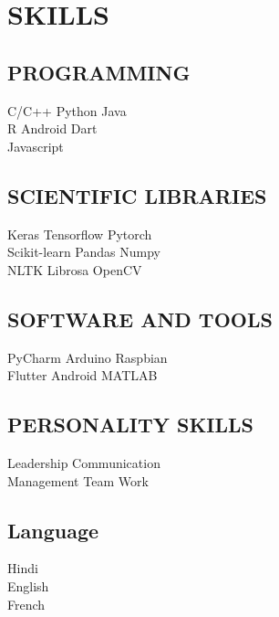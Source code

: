 \documentclass[a4paper]{deedy-resume-openfont}
\begin{document}
\begin{minipage}[t]{0.33\textwidth}

\section{SKILLS}
\subsection{PROGRAMMING}
\textbullet{}   C/C++ \textbullet{}   Python \textbullet{} Java \\
\textbullet{} R \textbullet{} Android \textbullet{} Dart \\ 
\textbullet{} Javascript 
\sectionsep
\subsection{SCIENTIFIC LIBRARIES}
\textbullet{} Keras \textbullet{} Tensorflow \textbullet{} Pytorch \\
\textbullet{} Scikit-learn \textbullet{} Pandas \textbullet{} Numpy \\
\textbullet{} NLTK \textbullet{} Librosa \textbullet{} OpenCV \\ 
\sectionsep
\subsection{SOFTWARE AND TOOLS}
\textbullet{} PyCharm \textbullet{} Arduino \textbullet{} Raspbian \\
\textbullet{} Flutter \textbullet{} Android \textbullet{} MATLAB \\
\sectionsep
\subsection{PERSONALITY SKILLS}
\textbullet{} Leadership \textbullet{} Communication \\
\textbullet{} Management \textbullet{} Team Work
\sectionsep
\subsection{Language}
 Hindi\\
 English\\
 French\\
%
%

\end{minipage} 
\end{document}
